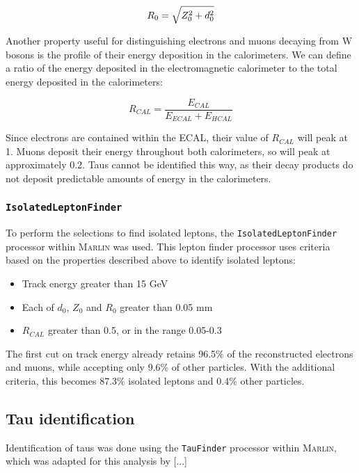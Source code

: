\begin{equation}
	\centering
	R_0 = \sqrt{Z_0^2 + d_0^2}
\label{eq:impact-parameter}
\end{equation}

Another property useful for distinguishing electrons and muons decaying from W bosons is the profile of their energy deposition in the calorimeters. We can define a ratio of the energy deposited in the electromagnetic calorimeter to the total energy deposited in the calorimeters:

\begin{equation}
	R_{CAL} = \frac{E_{CAL}}{E_{ECAL} + E_{HCAL}}
\label{eq:calorimeter-ratio}
\end{equation}

Since electrons are contained within the \acrshort{ECAL}, their value of $R_{CAL}$ will peak at 1. Muons deposit their energy throughout both calorimeters, so will peak at approximately 0.2. Taus cannot be identified this way, as their decay products do not deposit predictable amounts of energy in the calorimeters.

\subsubsection{\texttt{IsolatedLeptonFinder}}

To perform the selections to find isolated leptons, the \texttt{IsolatedLeptonFinder} processor within \textsc{Marlin} was used. This lepton finder processor uses criteria based on the properties described above to identify isolated leptons:

\begin{itemize}
	\item Track energy greater than 15 GeV
	\item Each of $d_0$, $Z_0$ and $R_0$ greater than 0.05 mm
	\item $R_{CAL}$ greater than 0.5, or in the range 0.05-0.3	
\end{itemize}

The first cut on track energy already retains 96.5\% of the reconstructed electrons and muons, while accepting only 9.6\% of other particles. With the additional criteria, this becomes 87.3\% isolated leptons and 0.4\% other particles.

\subsection{Tau identification}
Identification of taus was done using the \texttt{TauFinder} processor within \textsc{Marlin}, which was adapted for this analysis by [...]

